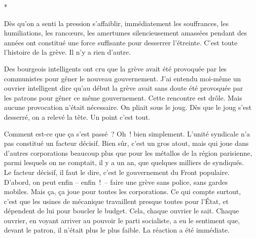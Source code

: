 \documentclass[french,twoside]{book} %
\begin{document}
\begin{center}
*\end{center}
\noindent Dès qu'on a senti la pression s'affaiblir, immédiatement les souffrances, les humiliations, les rancœurs, les amertumes silencieusement amassées pendant des années ont constitué une force suffisante pour desserrer l'étreinte. C'est toute l'histoire de la grève. Il n'y a rien d'autre.\par
Des bourgeois intelligents ont cru que la grève avait été provoquée par les communistes pour gêner le nouveau gouvernement. J'ai entendu moi-même un ouvrier intelligent dire qu'au début la grève avait sans doute été provoquée par les patrons pour gêner ce même gouvernement. Cette rencontre est drôle. Mais aucune provocation n'était nécessaire. On pliait sous le joug. Dès que le joug s'est desserré, on a relevé la tête. Un point c'est tout.\par
Comment est-ce que ça s'est passé ? Oh ! bien simplement. L'unité syndicale n'a pas constitué un facteur décisif. Bien sûr, c'est un gros atout, mais qui joue dans d'autres corporations beaucoup plus que pour les métallos de la région parisienne, parmi lesquels on ne comptait, il y a un an, que quelques milliers de syndiqués. Le facteur décisif, il faut le dire, c'est le gouvernement du Front populaire. D'abord, on peut enfin – enfin ! – faire une grève sans police, sans gardes mobiles. Mais ça, ça joue pour toutes les corporations. Ce qui compte surtout, c'est que les usines de mécanique travaillent presque toutes pour l'État, et dépendent de lui pour boucler le budget. Cela, chaque ouvrier le sait. Chaque ouvrier, en voyant arriver au pouvoir le parti socialiste, a eu le sentiment que, devant le patron, il n'était plus le plus faible. La réaction a été immédiate.\par
\end{document}

